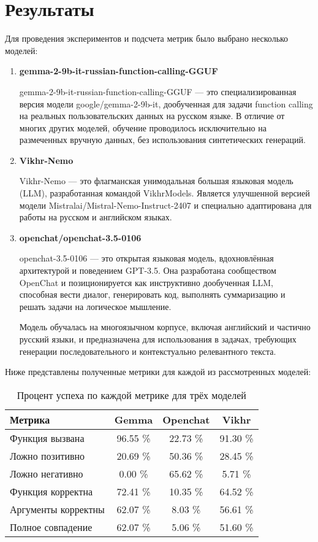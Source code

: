 \documentclass[14pt]{extarticle}
\begin{document}
\section{Результаты}
Для проведения экспериментов и подсчета метрик было выбрано несколько моделей:
\begin{enumerate}
\item \textbf{gemma-2-9b-it-russian-function-calling-GGUF}

gemma-2-9b-it-russian-function-calling-GGUF — это специализированная версия модели google/gemma-2-9b-it, дообученная для задачи function calling на реальных пользовательских данных на русском языке. В отличие от многих других моделей, обучение проводилось исключительно на размеченных вручную данных, без использования синтетических генераций.

\item \textbf{Vikhr-Nemo}

Vikhr-Nemo — это флагманская унимодальная большая языковая модель (LLM), разработанная командой VikhrModels. Является улучшенной версией модели Mistralai/Mistral-Nemo-Instruct-2407 и специально адаптирована для работы на русском и английском языках.

\item \textbf{openchat/openchat-3.5-0106}

openchat-3.5-0106 — это открытая языковая модель, вдохновлённая архитектурой и поведением GPT-3.5. Она разработана сообществом OpenChat и позиционируется как инструктивно дообученная LLM, способная вести диалог, генерировать код, выполнять суммаризацию и решать задачи на логическое мышление.

Модель обучалась на многоязычном корпусе, включая английский и частично русский языки, и предназначена для использования в задачах, требующих генерации последовательного и контекстуально релевантного текста.
\end{enumerate}
Ниже представлены полученные метрики для каждой из рассмотренных моделей:
\begin{table}[htbp]
\centering
\caption{Процент успеха по каждой метрике для трёх моделей}
\label{tab:model_metrics_comparison}
\begin{tabular}{|l|c|c|c|}
\hline
\textbf{Метрика} & \textbf{Gemma} & \textbf{Openchat} & \textbf{Vikhr} \\
\hline
Функция вызвана & 96.55 \% & 22.73 \% & 91.30 \% \\
\hline
Ложно позитивно & 20.69 \% & 50.36 \% & 28.45 \% \\
\hline
Ложно негативно & 0.00 \% & 65.62 \% & 5.71 \% \\
\hline
Функция корректна & 72.41 \% & 10.35 \% & 64.52 \% \\
\hline
Аргументы корректны & 62.07 \% & 8.03 \% & 56.61 \% \\
\hline
Полное совпадение & 62.07 \% & 5.06 \% & 51.60 \% \\
\hline
\end{tabular}
\end{table}
\end{document}
